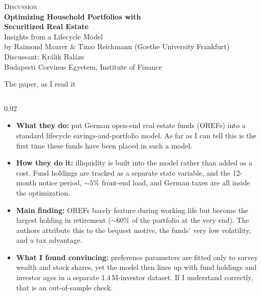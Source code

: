 \documentclass[aspectratio=169,10pt]{beamer}
\newcommand{\card}[1]{%
  \begin{columns}\begin{column}{0.92\textwidth}#1\end{column}\end{columns}}
\newcommand{\lead}[1]{\textbf{#1}}
\begin{document}
\begin{frame}[plain]
  \vfill\centering
  {\footnotesize\textsc{Discussion}}\\[1.4em]
  {\Large\textbf{Optimizing Household Portfolios with}}\\[0.25em]
  {\Large\textbf{Securitized Real Estate}}\\[0.5em]
  {\large Insights from a Lifecycle Model}\\[1.0em]
  {\normalsize by Raimond Maurer \& Timo Reichmann (Goethe University Frankfurt)}\\[2.0em]
  {\normalsize Discussant: Kr\'alik Bal\'azs}\\[0.3em]
  {\footnotesize Budapesti Corvinus Egyetem, Institute of Finance}
  \vfill
\end{frame}

\begin{frame}{The paper, as I read it}
  \vfill
  \card{\small
  \begin{itemize}\setlength{\itemsep}{0.8ex}
    \item \lead{What they do:} put German open-end real estate funds (OREFs)
      into a standard lifecycle savings-and-portfolio model. As far as I can
      tell this is the first time these funds have been placed in such a model.
    \item \lead{How they do it:} illiquidity is built into the model rather
      than added as a cost. Fund holdings are tracked as a separate state
      variable, and the 12-month notice period, ${\sim}5\%$ front-end load, and
      German taxes are all inside the optimization.
    \item \lead{Main finding:} OREFs barely feature during working life but
      become the largest holding in retirement (${\sim}60\%$ of the portfolio
      at the very end). The authors attribute this to the bequest motive, the
      funds' very low volatility, and a tax advantage.
    \item \lead{What I found convincing:} preference parameters are fitted only
      to survey wealth and stock shares, yet the model then lines up with fund
      holdings and investor ages in a separate 1.4\,M-investor dataset. If I
      understand correctly, that is an out-of-sample check.
  \end{itemize}}
  \vfill
\end{frame}
\end{document}

